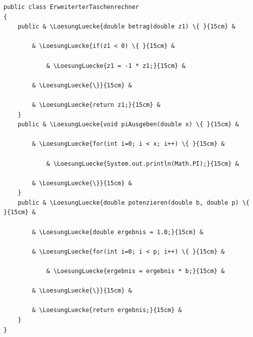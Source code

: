 \begin{minipage}[t]{\textwidth}
\Large
\begin{lstlisting}[escapechar=\&]
public class ErweiterterTaschenrechner
{    
    public & \LoesungLuecke{double betrag(double z1) \{ }{15cm} &
    
        & \LoesungLuecke{if(z1 < 0) \{ }{15cm} &
        
            & \LoesungLuecke{z1 = -1 * z1;}{15cm} &
            
        & \LoesungLuecke{\}}{15cm} &   
        
        & \LoesungLuecke{return z1;}{15cm} &   
    }
    public & \LoesungLuecke{void piAusgeben(double x) \{ }{15cm} &
    
        & \LoesungLuecke{for(int i=0; i < x; i++) \{ }{15cm} &
        
            & \LoesungLuecke{System.out.println(Math.PI);}{15cm} &
            
        & \LoesungLuecke{\}}{15cm} &
    }
    public & \LoesungLuecke{double potenzieren(double b, double p) \{ }{15cm} &

        & \LoesungLuecke{double ergebnis = 1.0;}{15cm} &
    
        & \LoesungLuecke{for(int i=0; i < p; i++) \{ }{15cm} &
        
            & \LoesungLuecke{ergebnis = ergebnis * b;}{15cm} &
            
        & \LoesungLuecke{\}}{15cm} &
            
        & \LoesungLuecke{return ergebnis;}{15cm} &
    }
}
\end{lstlisting}

\end{minipage}